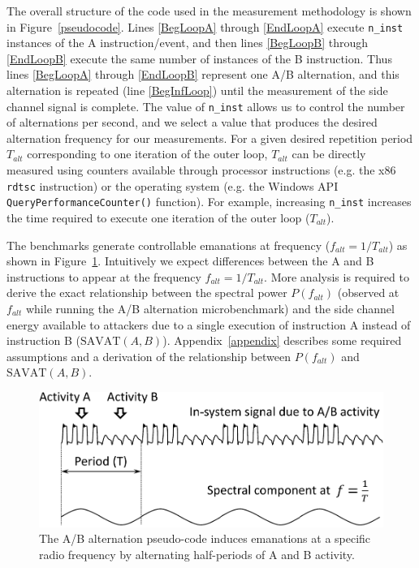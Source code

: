 The overall structure of the code used in the measurement methodology is shown in Figure~\ref{pseudocode}. Lines \ref{BegLoopA} through \ref{EndLoopA} execute \texttt{n\_inst} instances of the A instruction/event, and then lines \ref{BegLoopB} through \ref{EndLoopB} execute the same number of instances of the B instruction. Thus lines \ref{BegLoopA} through \ref{EndLoopB} represent one A/B alternation, and this alternation is repeated (line \ref{BegInfLoop}) until the measurement of the side channel signal is complete. The value of \texttt{n\_inst} allows us to control the number of alternations per second, and we select a value that produces the desired alternation frequency for our measurements. For a given desired repetition period $T_{alt}$ corresponding to one iteration of the outer loop, $T_{alt}$ can be directly measured using counters available through processor instructions (e.g. the x86 \texttt{rdtsc} instruction) or the operating system (e.g. the Windows API \texttt{QueryPerformanceCounter()} function).  For example, increasing \texttt{n\_inst} increases the time required to execute one iteration of the outer loop ($T_{alt}$).

The benchmarks generate controllable emanations at frequency ($f_{alt} = 1/T_{alt}$) as shown in Figure~\ref{Fig:Carrier}. Intuitively we expect differences between the A and B instructions to appear at the frequency $f_{alt} = 1/T_{alt}$. More analysis is required to derive the exact relationship between the spectral power $P(f_{alt})$ (observed at $f_{alt}$ while running the A/B alternation microbenchmark) and the side channel energy available to attackers due to a single execution of instruction A instead of instruction B ($\textrm{SAVAT}(A,B)$). Appendix~\ref{appendix} describes some required assumptions and a derivation of the relationship between $P(f_{alt})$ and $\textrm{SAVAT}(A,B)$. 

\begin{figure}[htb]
  \centering
  \includegraphics[scale=0.45,clip]{../TEMC_SAVAT/TEMC_314_2013_Fig1a.pdf}
  \caption{The A/B alternation pseudo-code induces emanations at a specific radio frequency by alternating half-periods of A and B activity.}
  \label{Fig:Carrier}
\end{figure}

